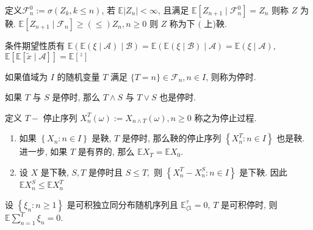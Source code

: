 \documentclass[10pt]{yerbaformat}
\begin{document}
\begin{definition}
    定义$\mathcal{F}_{n}^{0}:=\sigma\left(Z_{k}, k \leq n\right)$, 若 $\mathbb{E}\left|Z_{n}\right|<\infty$, 且满足 $\mathbb{E}\left[Z_{n+1} \mid \mathcal{F}_{n}^{0}\right]=Z_{n}$ 则称 $Z$ 为鞅. $\mathbb{E}\left[Z_{n+1} \mid \mathcal{F}_{n}\right] \geq(\leq) Z_{n}, n \geq 0$ 则 $Z$ 称为下 $($ 上)鞅.
\end{definition}

\par 条件期望性质有 $\mathbb{E}(\mathbb{E}(\xi \mid \mathcal{A}) \mid \mathcal{B})=\mathbb{E}(\mathbb{E}(\xi \mid \mathcal{B}) \mid \mathcal{A})=\mathbb{E}(\xi \mid \mathcal{A})$, $\mathbb{E}[\mathbb{E}[\tilde{x} \mid \mathcal{A}]]=\mathbb{E}\left[{ }^{z}\right]$



\begin{definition}
    如果值域为 $I$ 的随机变量 $T$ 满足 $\{T=n\} \in \mathcal{F}_{n}, n \in I$, 则称为停时.
\end{definition}

\begin{lemma}
    如果 $T$ 与 $S$ 是停时, 那么 $T \wedge S$ 与 $T \vee S$ 也是停时.
\end{lemma}

\begin{definition}
    定义 $T-$ 停止序列 $X_{n}^{T}(\omega):=X_{n \wedge T}(\omega), n \geq 0$ 称之为停止过程.
\end{definition}

\begin{theorem}[有界停止定理]
    \begin{enumerate}
        \item 如果 $\left\{X_{n}: n \in I\right\}$ 是鞅, $T$ 是停时, 那么鞅的停止序列 $\left\{X_{n}^{T}: n \in I\right\}$ 也是鞅. 进一步, 如果 $T$ 是有界的, 那么 $\mathbb{E} X_{T}=\mathbb{E} X_{0}$.
        \item 设 $X$ 是下鞅, $S, T$ 是停时且 $S \leq T,$ 则 $\left\{X_{n}^{T}-X_{n}^{S}: n \in I\right\}$ 是下鞅. 因此 $\mathbb{E} X_{n}^{S} \leq \mathbb{E} X_{n}^{T}$
    \end{enumerate}
\end{theorem}

\begin{theorem}[Wald 等式]
    设 $\left\{\xi_{n}: n \geq 1\right\}$ 是可积独立同分布随机序列且 $\mathbb{E}_{\zeta 1}^{\tau}=0$, $T$ 是可积停时, 则 $\mathbb{E} \sum_{n=1}^{T} \xi_{n}=0 .$
\end{theorem}
\end{document}
